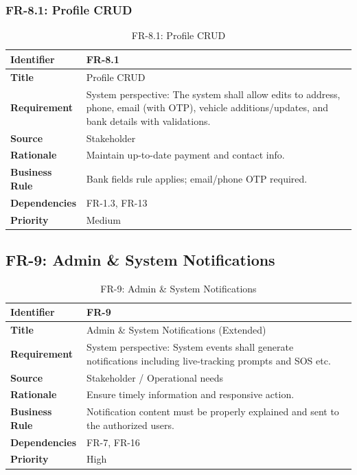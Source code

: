 \subsubsection{FR-8.1: Profile CRUD}

\begin{longtable}{|p{3cm}|p{12cm}|}
\caption{FR-8.1: Profile CRUD}
\label{tab:fr-8-1} \\
\hline
\rowcolor{lightgray!30}
\textbf{Identifier} & FR-8.1 \\
\hline
\textbf{Title} & Profile CRUD \\
\hline
\textbf{Requirement} & System perspective: The system shall allow edits to address, phone, email (with OTP), vehicle additions/updates, and bank details with validations. \\
\hline
\textbf{Source} & Stakeholder \\
\hline
\textbf{Rationale} & Maintain up-to-date payment and contact info. \\
\hline
\textbf{Business Rule} & Bank fields rule applies; email/phone OTP required. \\
\hline
\textbf{Dependencies} & FR-1.3, FR-13 \\
\hline
\textbf{Priority} & Medium \\
\hline
\end{longtable}

\subsection{FR-9: Admin \& System Notifications}

\begin{longtable}{|p{3cm}|p{12cm}|}
\caption{FR-9: Admin \& System Notifications}
\label{tab:fr-9} \\
\hline
\rowcolor{lightgray!30}
\textbf{Identifier} & FR-9 \\
\hline
\textbf{Title} & Admin \& System Notifications (Extended) \\
\hline
\textbf{Requirement} & System perspective: System events shall generate notifications including live-tracking prompts and SOS etc. \\
\hline
\textbf{Source} & Stakeholder / Operational needs \\
\hline
\textbf{Rationale} & Ensure timely information and responsive action. \\
\hline
\textbf{Business Rule} & Notification content must be properly explained and sent to the authorized users. \\
\hline
\textbf{Dependencies} & FR-7, FR-16 \\
\hline
\textbf{Priority} & High \\
\hline
\end{longtable}

